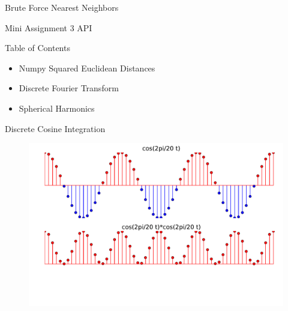 \documentclass{beamer}
\begin{document}
\begin{frame}{Brute Force Nearest Neighbors}



\end{frame}


\begin{frame}{Mini Assignment 3 API}



\end{frame}

\begin{frame}{Table of Contents}
\begin{itemize}[label=$\vartriangleright$]
	\item Numpy Squared Euclidean Distances
\end{itemize}
\begin{itemize}[label=$\blacktriangleright$]
	\item Discrete Fourier Transform
\end{itemize}
\begin{itemize}[label=$\vartriangleright$]
	\item Spherical Harmonics
\end{itemize}
\end{frame}

\begin{frame}{Discrete Cosine Integration}

\begin{figure}[t]
    \includegraphics[width=\textwidth]{cosSqr.pdf}
\end{figure}

\end{frame}
\end{document}
